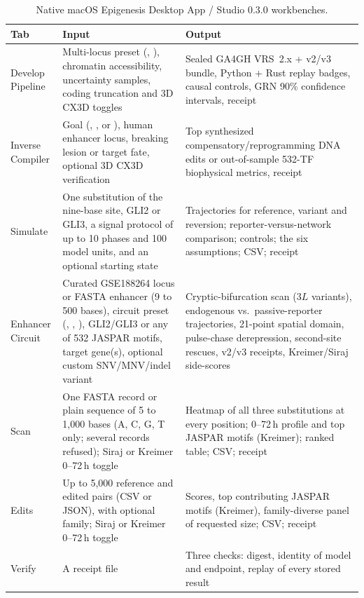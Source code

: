 \documentclass[10.5pt,a4paper]{article}
\begin{document}
\begin{table}[tb]
\small
\caption{Native macOS Epigenesis Desktop App / Studio 0.3.0 workbenches.}\label{tab:studio}
\begin{tabular}{@{}L{25mm}L{57mm}L{66mm}@{}}
\toprule
Tab & Input & Output \\
\midrule
Develop Pipeline & Multi-locus preset (, ), chromatin accessibility, uncertainty samples, coding truncation and 3D CX3D toggles & Sealed GA4GH VRS~2.x +  v2/v3 bundle, Python + Rust replay badges, causal controls, GRN 90\% confidence intervals, receipt \\
Inverse Compiler & Goal (, , or ), human enhancer locus, breaking lesion or target fate, optional 3D CX3D verification & Top synthesized compensatory/reprogramming DNA edits or out-of-sample  532-TF biophysical metrics, receipt \\
Simulate & One substitution of the nine-base site, GLI2 or GLI3, a signal protocol of up to 10 phases and 100 model units, and an optional starting state & Trajectories for reference, variant and reversion; reporter-versus-network comparison; controls; the six assumptions; CSV; receipt \\
Enhancer Circuit & Curated GSE188264 locus or FASTA enhancer (9 to 500 bases), circuit preset (, , ), GLI2/GLI3 or any of 532 JASPAR motifs, target gene(s), optional custom SNV/MNV/indel variant & Cryptic-bifurcation scan ($3L$ variants), endogenous vs.\ passive-reporter trajectories, 21-point spatial domain, pulse-chase derepression, second-site rescues,  v2/v3 receipts, Kreimer/Siraj side-scores \\
Scan & One FASTA record or plain sequence of 5 to 1,000 bases (A, C, G, T only; several records refused); Siraj or Kreimer 0--72\,h toggle & Heatmap of all three substitutions at every position; 0--72\,h profile and top JASPAR motifs (Kreimer); ranked table; CSV; receipt \\
Edits & Up to 5,000 reference and edited pairs (CSV or JSON), with optional family; Siraj or Kreimer 0--72\,h toggle & Scores, top contributing JASPAR motifs (Kreimer), family-diverse panel of requested size; CSV; receipt \\
Verify & A receipt file & Three checks: digest, identity of model and endpoint, replay of every stored result \\
\bottomrule
\end{tabular}
\end{table}
\end{document}
